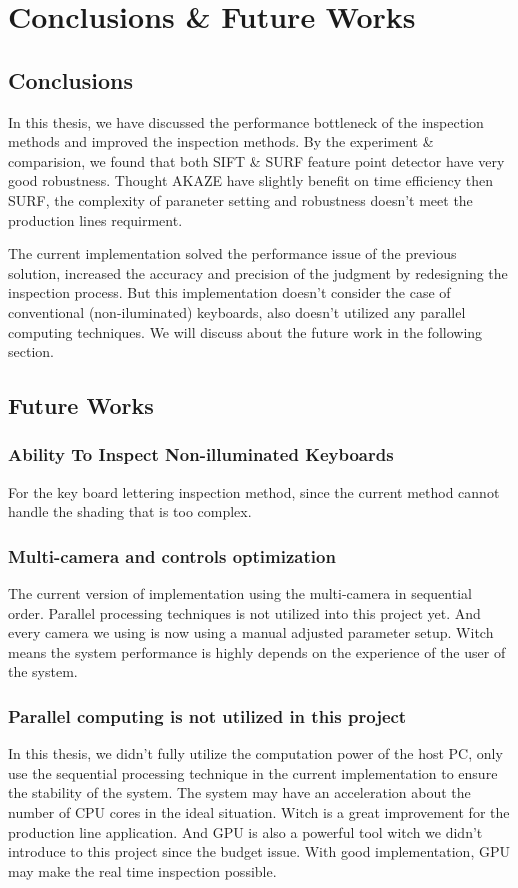 \chapter{Conclusions \& Future Works}
\label{c:conclusion-and-future-works}

\section{Conclusions}
	In this thesis, we have discussed the performance bottleneck of the inspection methods and improved the inspection methods.
	By the experiment \& comparision, we found that both SIFT \& SURF feature point detector have very good robustness.
	Thought AKAZE have slightly benefit on time efficiency then SURF, the complexity of paraneter setting and robustness doesn't meet the production lines requirment.

 	The current implementation solved the performance issue of the previous solution, increased the accuracy and precision of the judgment by redesigning the inspection process.
	But this implementation doesn't consider the case of conventional (non-iluminated) keyboards, also doesn't utilized any parallel computing techniques.
	We will discuss about the future work in the following section.

\section{Future Works}
	\subsection{Ability To Inspect Non-illuminated Keyboards}
		For the key board lettering inspection method, since the current method cannot handle the shading that is too complex.

	\subsection{Multi-camera and controls optimization}
		The current version of implementation using the multi-camera in sequential order. Parallel processing techniques is not utilized into this project yet.
		And every camera we using is now using a manual adjusted parameter setup. Witch means the system performance is highly depends on the experience of the user of the system.


	\subsection{Parallel computing is not utilized in this project}
		In this thesis, we didn't fully utilize the computation power of the host PC, only use the sequential processing technique in the current implementation to ensure the stability of the system.
		The system may have an acceleration about the number of CPU cores in the ideal situation. 
		Witch is a great improvement for the production line application.
		And GPU is also a powerful tool witch we didn't introduce to this project since the budget issue.
		With good implementation, GPU may make the real time inspection possible.
	
